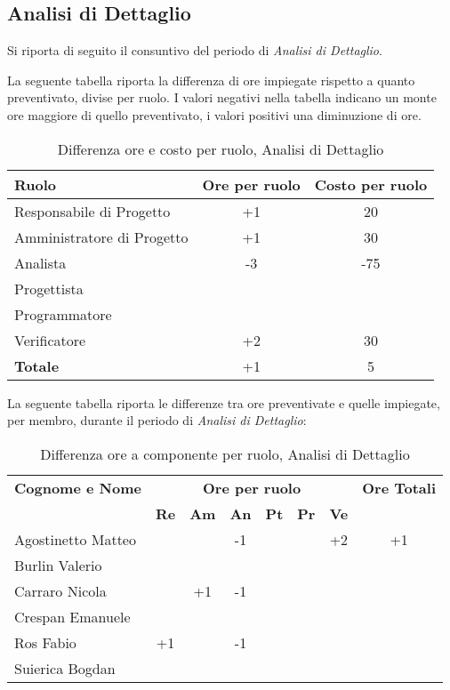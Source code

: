 \subsection{Analisi di Dettaglio}
Si riporta di seguito il consuntivo del periodo di \textit{Analisi di Dettaglio}.

\noindent La seguente tabella riporta la differenza di ore impiegate rispetto a quanto preventivato, divise per ruolo. I valori negativi nella tabella indicano un monte ore maggiore di quello preventivato, i valori positivi una diminuzione di ore.

\begin{table}[h]
	\centering
	\begin{tabular}{|l|c|c|}
		\toprule
		\textbf{Ruolo} & \textbf{Ore per ruolo} & \textbf{Costo per ruolo} \\
		
		\midrule
		Responsabile di Progetto & +1 & 20 \\
		Amministratore di Progetto & +1 & 30 \\ 
		Analista & -3 & -75 \\
		Progettista & & \\
		Programmatore & & \\
		Verificatore & +2 & 30 \\
		\midrule
		\textbf{Totale} & +1 & 5 \\
		
		\bottomrule
	\end{tabular}
	\caption{Differenza ore e costo per ruolo, Analisi di Dettaglio}
	\label{tab4}
\end{table} 

\noindent La seguente tabella riporta le differenze tra ore preventivate e quelle impiegate, per membro, durante il periodo di \textit{Analisi di Dettaglio}: 
\begin{table}[h]
	\centering
	\begin{tabular}{|l|c|c|c|c|c|c|c|}
		\toprule
		\textbf{Cognome e Nome} & \multicolumn{6}{c}{\textbf{Ore per ruolo}} & \textbf{Ore Totali} \\
		& \textbf{Re} & \textbf{Am} & \textbf{An} & \textbf{Pt} & \textbf{Pr} & \textbf{Ve} & \\
		
		\midrule
		Agostinetto Matteo & & & -1 & & & +2 & +1 \\
		Burlin Valerio & & & & & & & \\ 
		Carraro Nicola & & +1 & -1 & & & & \\
		Crespan Emanuele & & & & & & & \\
		Ros Fabio & +1 & & -1 & & & & \\
		Suierica Bogdan & & & & & & & \\
		
		\bottomrule
	\end{tabular}
	\caption{Differenza ore a componente per ruolo, Analisi di Dettaglio}
\end{table}

